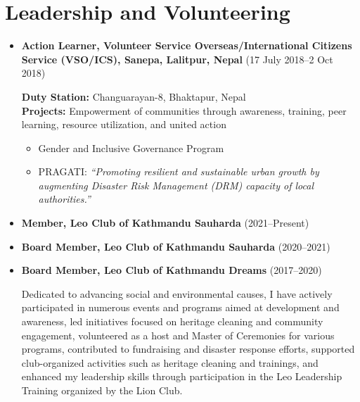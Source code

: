 \documentclass[a4paper,11.5pt]{article}
\begin{document}
\section{Leadership and Volunteering}

\begin{itemize}
    \item \textbf{Action Learner, Volunteer Service Overseas/International Citizens Service (VSO/ICS), Sanepa, Lalitpur, Nepal} (17 July 2018--2 Oct 2018)

    \textbf{Duty Station:} Changuarayan-8, Bhaktapur, Nepal\\
    \textbf{Projects:} Empowerment of communities through awareness, training, peer learning, resource utilization, and united action
    \begin{itemize}
        \item Gender and Inclusive Governance Program
        \item PRAGATI: \textit{“Promoting resilient and sustainable urban growth by augmenting Disaster Risk
        Management (DRM) capacity of local authorities.”}
    \end{itemize}
    \item \textbf{Member, Leo Club of Kathmandu Sauharda} (2021--Present)
    \item \textbf{Board Member, Leo Club of Kathmandu Sauharda} (2020--2021)
    \item \textbf{Board Member, Leo Club of Kathmandu Dreams} (2017--2020)
    
    Dedicated to advancing social and environmental causes, I have actively participated in numerous events and programs aimed at development and awareness, led initiatives focused on heritage cleaning and community engagement, volunteered as a host and Master of Ceremonies for various programs, contributed to fundraising and disaster response efforts, supported club-organized activities such as heritage cleaning and trainings, and enhanced my leadership skills through participation in the Leo Leadership Training organized by the Lion Club.

\end{itemize}
\end{document}
